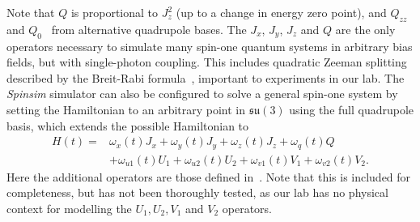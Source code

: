 \documentclass{jors}
\begin{document}
		Note that $ Q $ is proportional to $ J_z^2 $ (up to a change in energy zero point), and $ Q_{zz} $~\cite{hamley_spin-nematic_2012} and $ Q_0 $~\cite{di_dipolequadrupole_2010} from alternative quadrupole bases.
		The $ J_x $, $ J_y $, $ J_z $ and $ Q $ are the only operators necessary to simulate many spin-one quantum systems in arbitrary bias fields, but with single-photon coupling.
		This includes quadratic Zeeman splitting described by the Breit-Rabi formula~\cite{mockler_atomic_1961}, important to experiments in our lab.
		The \emph{Spinsim} simulator can also be configured to solve a general spin-one system by setting the Hamiltonian to an arbitrary point in $ \mathfrak{su}(3) $ using the full quadrupole basis, which extends the possible Hamiltonian to
		\begin{align}
			H(t) =& \omega_x(t) J_x + \omega_y(t) J_y + \omega_z(t) J_z + \omega_q(t) Q\nonumber\\
			&+ \omega_{u1}(t) U_1 + \omega_{u2}(t) U_2 + \omega_{v1}(t) V_1 + \omega_{v2}(t) V_2.
		\end{align}
		Here the additional operators are those defined in~\cite{di_dipolequadrupole_2010}. Note that this is included for completeness, but has not been thoroughly tested, as our lab has no physical context for modelling the $ U_1, U_2, V_1 $ and $ V_2 $ operators.



		


\end{document}
